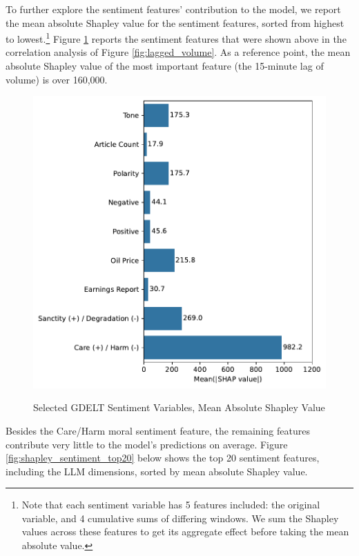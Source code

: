 \documentclass[12pt]{article}
\begin{document}
To further explore the sentiment features' contribution to the model, we report the mean absolute Shapley value for the sentiment features, sorted from highest to lowest.\footnote{Note that each sentiment variable has 5 features included: the original variable, and 4 cumulative sums of differing windows. We sum the Shapley values across these features to get its aggregate effect before taking the mean absolute value.} Figure \ref{fig:shapley_sentiment} reports the sentiment features that were shown above in the correlation analysis of Figure \ref{fig:lagged_volume}. As a reference point, the mean absolute Shapley value of the most important feature (the 15-minute lag of volume) is over 160,000.
\begin{figure}[H]
    \centering
    \caption{Selected GDELT Sentiment Variables, Mean Absolute Shapley Value}
    \includegraphics[width=0.75\linewidth]{../Output/shap_abs_sentiment.pdf}
    \label{fig:shapley_sentiment}
\end{figure}
Besides the Care/Harm moral sentiment feature, the remaining features contribute very little to the model's predictions on average. Figure \ref{fig:shapley_sentiment_top20} below shows the top 20 sentiment features, including the LLM dimensions, sorted by mean absolute Shapley value.
\end{document}

